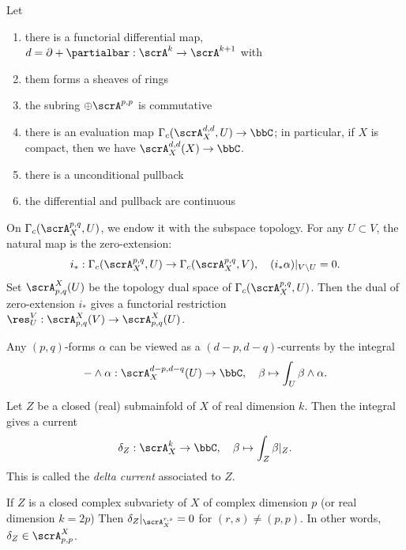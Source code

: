 \begin{proposition}[label=\labelNFM{prop:basic-properties-of-forms-with-topology}, status=draft, tag=0000000]
	Let \Yang{}
	\begin{enumerate}
		\item there is a functorial differential map, $d = \partial + \partialbar: \scrA^{k} \to \scrA^{k+1}$ with 
		\item them forms a sheaves of rings
		\item the subring $\oplus \scrA^{p,p}$ is commutative
		\item there is an evaluation map $\Gamma_c(\scrA_X^{d,d},U) \to \bbC$; in particular, if $X$ is compact, then we have $\scrA_X^{d,d}(X) \to \bbC$.
		\item there is a unconditional pullback
		\item the differential and pullback are continuous
	\end{enumerate}
	\Yang{}
\end{proposition}

\begin{construction}[label=\labelNFM{constr:currents}, status=draft, tag=0000000]
	On $\Gamma_c(\scrA_X^{p,q},U)$, we endow it with the subspace topology.
	For any $U \subset V$, the natural map is the zero-extension:
	\[ i_*: \Gamma_c(\scrA_X^{p,q},U) \to \Gamma_c(\scrA_X^{p,q},V), \quad (i_*\alpha)|_{V\setminus U} = 0. \]
	Set $\scrA_{p,q}^X(U)$ be the topology dual space of $\Gamma_c(\scrA_X^{p,q},U)$.
	Then the dual of zero-extension $i_*$ gives a functorial restriction $\res^V_U: \scrA_{p,q}^X(V) \to \scrA_{p,q}^X(U)$.

	\Yang{}
\end{construction}

\begin{example}[label=\labelNFM{eg:forms-as-currents}, status=draft, tag=0000000]
	Any $(p,q)$-forms $\alpha$ can be viewed as a $(d-p,d-q)$-currents by the integral
	\[ - \wedge \alpha : \scrA_X^{d-p,d-q}(U) \to \bbC, \quad \beta \mapsto \int_U \beta \wedge \alpha. \]
\end{example}

\begin{example}[label=\labelNFM{eg:submainfolds-as-currents}, status=draft, tag=0000000]
	Let $Z$ be a closed (real) submainfold of $X$ of real dimension $k$.
	Then the integral gives a current
	\[ \delta_Z: \scrA_X^{k} \to \bbC, \quad \beta \mapsto \int_Z \beta|_Z. \]
	This is called the \emph{delta current} associated to $Z$.

	If $Z$ is a closed complex subvariety of $X$ of complex dimension $p$ (or real dimension $k=2p$)
	Then $\delta_Z|_{\scrA_X^{r,s}} = 0$ for $(r,s) \neq (p,p)$.
	In other words, $\delta_Z \in \scrA_{p,p}^X$.
	\Yang{}
\end{example}

